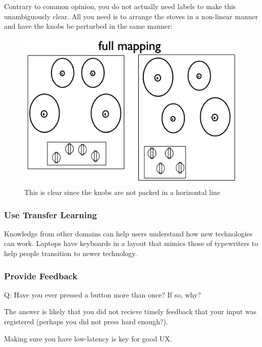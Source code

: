 Contrary to common opinion, you do not actually need labels to make this unambiguously clear. All you need is to arrange the stoves in a non-linear manner and have the knobs be perturbed in the same manner:
\begin{figure}[H]
    \centering
    \includegraphics[scale=0.2]{lectures/wk4/img/stove.png}
    \caption{This is clear since the knobs are not packed in a horizontal line}
    \label{fig:stove}
\end{figure}

\subsubsection{Use Transfer Learning}
Knowledge from other domains can help users understand how new technologies can work. Laptops have keyboards in a layout that mimics those of typewriters to help people transition to newer technology.

\subsubsection{Provide Feedback}
\begin{shaded}
Q: Have you ever pressed a button more than once? If so, why?
\end{shaded}
The answer is likely that you did not recieve timely feedback that your input was registered (perhaps you did not press hard enough?).

Making sure you have low-latency is key for good UX.

